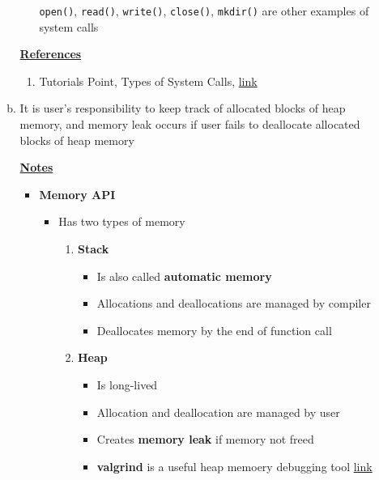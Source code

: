 \documentclass[12pt]{article}
\begin{document}
\begin{enumerate}[1.]
\begin{enumerate}[a)]
\begin{itemize}
            \bigskip

            \texttt{open()}, \texttt{read()}, \texttt{write()}, \texttt{close()}, \texttt{mkdir()} are other examples of system calls
        \end{itemize}

        \bigskip

        \underline{\textbf{References}}

        \begin{enumerate}[1)]
            \item Tutorials Point, Types of System Calls, \href{https://www.tutorialspoint.com/different-types-of-system-calls}{link}
        \end{enumerate}

        \item

        It is user's responsibility to keep track of allocated blocks of heap memory,
        and memory leak occurs if user fails to deallocate allocated blocks of heap memory


        \bigskip

        \underline{\textbf{Notes}}

        \begin{itemize}
            \item \textbf{Memory API}

            \begin{itemize}
                \item Has two types of memory

                \begin{enumerate}[1.]
                    \item \textbf{Stack}

                    \begin{itemize}
                        \item Is also called \textbf{automatic memory}
                        \item Allocations and deallocations are managed by compiler
                        \item Deallocates memory by the end of function call
                    \end{itemize}

                    \item \textbf{Heap}

                    \begin{itemize}
                        \item Is long-lived
                        \item Allocation and deallocation are managed by user
                        \item Creates \textbf{memory leak} if memory not freed
                        \item \textbf{valgrind} is a useful heap memoery debugging tool \href{https://www.valgrind.org/docs/manual/quick-start.html}{link}
                    \end{itemize}
                \end{enumerate}


\end{itemize}
\end{itemize}
\end{enumerate}
\end{enumerate}
\end{document}

